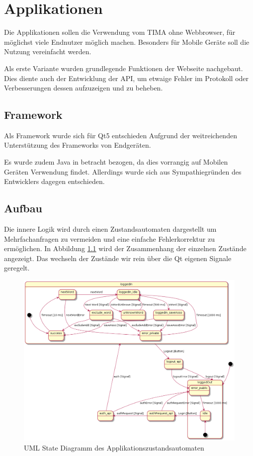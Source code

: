\chapter{Applikationen}
Die Applikationen sollen die Verwendung vom TIMA ohne Webbrowser, für möglichst
viele Endnutzer möglich machen.  Besonders für Mobile Geräte soll die Nutzung
vereinfacht werden.

Als erste Variante wurden grundlegende Funktionen der
Webseite nachgebaut.  Dies diente auch der Entwicklung der API, um etwaige
Fehler im Protokoll oder Verbesserungen dessen aufzuzeigen und zu beheben.

\section{Framework}
Als Framework wurde sich für Qt5 entschieden Aufgrund der weitreichenden
Unterstützung des Frameworks von Endgeräten.

Es wurde zudem Java in betracht bezogen, da dies vorrangig auf Mobilen Geräten
Verwendung findet. Allerdings wurde sich aus Sympathiegründen des Entwicklers
dagegen entschieden.

\section{Aufbau}
Die innere Logik wird durch einen Zustandsautomaten dargestellt um
Mehrfachanfragen zu vermeiden und eine einfache Fehlerkorrektur zu ermöglichen.
In Abbildung \ref{fig:uml_automata} wird der Zusammenhang der einzelnen
Zustände angezeigt. Das wechseln der Zustände wir rein über die Qt eigenen
Signale geregelt.
\begin{figure}[!h]
	\centering
	\includegraphics[width=\textwidth]{../UML/app_automata.png}
	\caption{UML State Diagramm des Applikationszustandsautomaten}
	\label{fig:uml_automata}
\end{figure}

